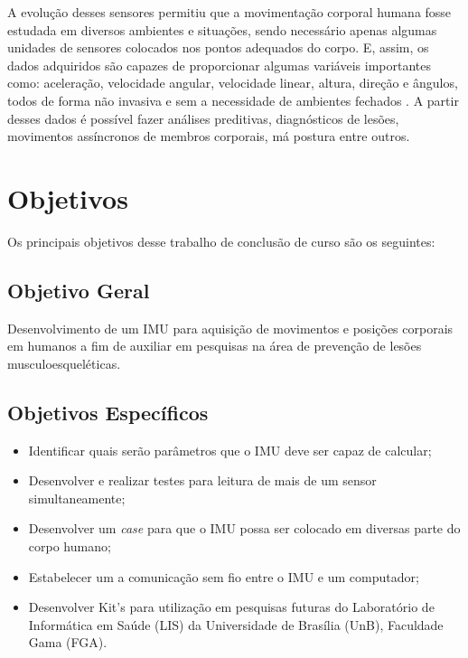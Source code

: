A evolução desses sensores permitiu que a movimentação corporal humana fosse estudada em diversos ambientes e situações, sendo necessário apenas algumas unidades de sensores colocados nos pontos adequados do corpo. E, assim, os dados adquiridos são capazes de proporcionar algumas variáveis importantes como: aceleração, velocidade angular, velocidade linear, altura, direção e ângulos, todos de forma não invasiva e sem a necessidade de ambientes fechados \cite{chang2016}. A partir desses dados é possível fazer análises preditivas, diagnósticos de lesões, movimentos assíncronos de membros corporais, má postura entre outros.



\section{Objetivos}

Os principais objetivos desse trabalho de conclusão de curso são os seguintes:

\subsection{Objetivo Geral}

Desenvolvimento de um IMU para aquisição de movimentos e posições corporais em humanos a fim de auxiliar em pesquisas na área de prevenção de lesões musculoesqueléticas.

\subsection {Objetivos Específicos} 
 \begin{itemize} 
		\item Identificar quais serão parâmetros que o IMU deve ser capaz de calcular;
		
		\item Desenvolver e realizar testes para leitura de mais de um sensor simultaneamente;
		
		\item Desenvolver um \textit{case} para que o IMU possa ser colocado em diversas parte do corpo humano;
		
		\item Estabelecer um a comunicação sem fio entre o IMU e um computador;
		
		\item Desenvolver Kit's para utilização em pesquisas futuras do Laboratório de Informática em Saúde (LIS) da Universidade de Brasília (UnB), Faculdade Gama (FGA).
		
		
	\end{itemize}
